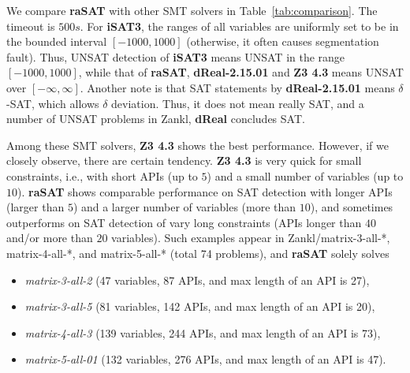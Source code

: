 \documentclass[runningheads,a4paper,oribibl]{llncs}
\begin{document}
We compare {\bf raSAT} with other SMT solvers in Table~\ref{tab:comparison}.
The timeout is $500s$. 
For {\bf iSAT3}, the ranges of all variables are uniformly set to be in the bounded interval
$[-1000, 1000]$ (otherwise, it often causes segmentation fault). 
Thus, UNSAT detection of {\bf iSAT3} means UNSAT in the range $[-1000, 1000]$, 
while that of {\bf raSAT}, \textbf{dReal-2.15.01} and {\bf Z3 4.3} means UNSAT over $[-\infty, \infty]$.
Another note is that SAT statements by \textbf{dReal-2.15.01} means $\delta$-SAT, which allows
$\delta$ deviation. Thus, it does not mean really SAT, and a number of UNSAT problems in
Zankl, \textbf{dReal} concludes SAT.

Among these SMT solvers, {\bf Z3 4.3} shows the best performance. 
However, if we closely observe, there are certain tendency. 
{\bf Z3 4.3} is very quick for small constraints, i.e., with 
short APIs (up to $5$) and a small number of variables (up to $10$). 
{\bf raSAT} shows comparable performance on SAT detection with 
longer APIs (larger than $5$) and a larger number of variables (more than $10$), 
and sometimes outperforms on SAT detection of vary long constraints 
(APIs longer than $40$ and/or more than $20$ variables). 
Such examples appear in Zankl/matrix-3-all-*, matrix-4-all-*, and matrix-5-all-* 
(total 74 problems), and {\bf raSAT} solely solves 
\begin{itemize}
\item {\em matrix-3-all-2} (47 variables, 87 APIs, and max length of an API is 27), 
\item {\em matrix-3-all-5} (81 variables, 142 APIs, and max length of an API is 20), 
\item {\em matrix-4-all-3} (139 variables, 244 APIs, and max length of an API is 73), %
\item {\em matrix-5-all-01} (132 variables, 276 APIs, and max length of an API is 47). 
\end{itemize}
\end{document}
